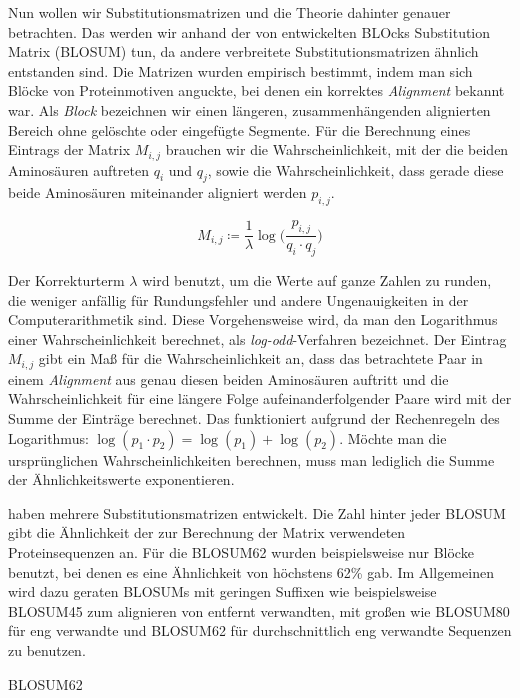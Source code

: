 Nun wollen wir Substitutionsmatrizen und die Theorie dahinter genauer betrachten. Das werden wir anhand der von \cite{hh92} entwickelten BLOcks Substitution Matrix (BLOSUM) tun, da andere verbreitete Substitutionsmatrizen ähnlich entstanden sind. Die Matrizen wurden empirisch bestimmt, indem man sich Blöcke von Proteinmotiven anguckte, bei denen ein korrektes \emph{Alignment} bekannt war. Als \emph{Block} bezeichnen wir einen längeren, zusammenhängenden alignierten Bereich ohne gelöschte oder eingefügte Segmente. Für die Berechnung eines Eintrags der Matrix $M_{i,j}$ brauchen wir die Wahrscheinlichkeit, mit der die beiden Aminosäuren auftreten $q_i$ und $q_j$, sowie die Wahrscheinlichkeit, dass gerade diese beide Aminosäuren miteinander aligniert werden $p_{i,j}$.

\begin{equation}
	M_{i,j} \coloneqq \frac{1}{\lambda} \log\bigg( \frac{p_{i,j}}{q_i\cdot q_j} \bigg)
\end{equation}

Der Korrekturterm $\lambda$ wird benutzt, um die Werte auf ganze Zahlen zu runden, die weniger anfällig für Rundungsfehler und andere Ungenauigkeiten in der Computerarithmetik sind. Diese Vorgehensweise wird, da man den Logarithmus einer Wahrscheinlichkeit berechnet, als \emph{log-odd}-Verfahren bezeichnet. Der Eintrag $M_{i,j}$ gibt ein Maß für die Wahrscheinlichkeit an, dass das betrachtete Paar in einem \emph{Alignment} aus genau diesen beiden Aminosäuren auftritt und die Wahrscheinlichkeit für eine längere Folge aufeinanderfolgender Paare wird mit der Summe der Einträge berechnet. Das funktioniert aufgrund der Rechenregeln des Logarithmus: $\log(p_1 \cdot p_2) = \log(p_1) + \log(p_2)$. Möchte man die ursprünglichen Wahrscheinlichkeiten berechnen, muss man lediglich die Summe der Ähnlichkeitswerte exponentieren. 

\cite{hh92} haben mehrere Substitutionsmatrizen entwickelt. Die Zahl hinter jeder BLOSUM gibt die Ähnlichkeit der zur Berechnung der Matrix verwendeten Proteinsequenzen an. Für die BLOSUM62 wurden beispielsweise nur Blöcke benutzt, bei denen es eine Ähnlichkeit von höchstens 62\% gab. Im Allgemeinen wird dazu geraten BLOSUMs mit geringen Suffixen wie beispielsweise BLOSUM45 zum alignieren von entfernt verwandten, mit großen wie BLOSUM80 für eng verwandte und BLOSUM62 für durchschnittlich eng verwandte Sequenzen zu benutzen.

BLOSUM62

